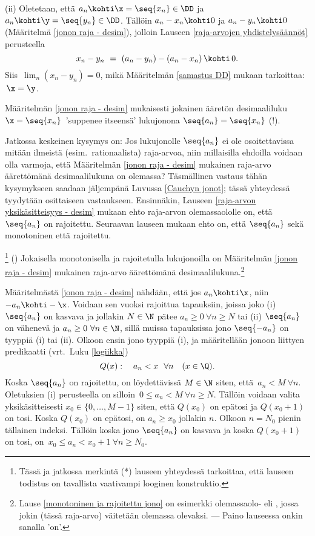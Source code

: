 (ii) Oletetaan, että $a_n \kohti \x = \seq{x_n}\in\DD$ ja $a_n \kohti \y = \seq{y_n}\in\DD$.
Tällöin $a_n-x_n \kohti 0$ ja $a_n-y_n \kohti 0$ (Määritelmä \ref{jonon raja - desim}),
jolloin Lauseen \ref{raja-arvojen yhdistelysäännöt} perusteella
\[
x_n-y_n\ =\ (a_n-y_n)-(a_n-x_n) \,\kohti\, 0.
\]
Siis $\,\lim_n(x_n-y_n)=0$, mikä Määritelmän \ref{samastus DD} mukaan tarkoittaa: $\,\x=\y$.
\loppu
\begin{Exa} Määritelmän \ref{jonon raja - desim} mukaisesti jokainen ääretön desimaaliluku
$\x=\seq{x_n}\,$ 'suppenee itseensä' lukujonona $\seq{a_n}=\seq{x_n}$ (!). \loppu
\end{Exa}

Jatkossa keskeinen kysymys on: Jos lukujonolle $\seq{a_n}$ ei ole osoitettavissa mitään
ilmeistä (esim.\ rationaalista) raja-arvoa, niin millaisilla ehdoilla voidaan olla varmoja,
että Määritelmän \ref{jonon raja - desim} mukainen raja-arvo äärettömänä desimaalilukuna on
olemassa? Täsmällinen vastaus tähän kysymykseen saadaan jäljempänä Luvussa \ref{Cauchyn jonot};
tässä yhteydessä tyydytään osittaiseen vastaukseen. Ensinnäkin, Lauseen
\ref{raja-arvon yksikäsitteisyys - desim} mukaan  ehto raja-arvon
olemassaololle on, että $\seq{a_n}$ on rajoitettu. Seuraavan lauseen mukaan 
ehto on, että $\seq{a_n}$ sekä monotoninen että rajoitettu. 
\begin{*Lause}\footnote[2]{Tässä ja jatkossa merkintä (*) lauseen yhteydessä tarkoittaa,
että lauseen todistus on tavallista vaativampi looginen konstruktio.} 
\label{monotoninen ja rajoitettu jono} ()
Jokaisella monotonisella ja rajoitetulla lukujonoilla on Määritelmän
\ref{jonon raja - desim} mukainen raja-arvo äärettömänä desimaalilukuna.\footnote[3]{Lause
\ref{monotoninen ja rajoitettu jono} on esimerkki olemassaolo- eli ,
jossa jokin (tässä raja-arvo) väitetään olemassa olevaksi. --- Paino lauseessa onkin sanalla
'on'. }
\end{*Lause}
\tod Määritelmästä \ref{jonon raja - desim} nähdään, että jos $a_n \kohti \x$, niin
$-a_n \kohti -\x$. Voidaan sen vuoksi rajoittua tapauksiin, joissa joko (i) $\seq{a_n}$ on
kasvava ja jollakin $N\in\N$ pätee $a_n \ge 0\ \forall n \ge N$ tai (ii) $\seq{a_n}$ on
vähenevä ja $a_n \ge 0\ \forall n\in\N$, sillä muissa tapauksissa jono $\seq{-a_n}$ on tyyppiä
(i) tai (ii). Olkoon ensin jono tyyppiä (i), ja määritellään jonoon liittyen predikaatti
(vrt.\ Luku \ref{logiikka})
\[
Q(x): \quad a_n < x \ \ \forall n \quad (x \in \Q).
\]
Koska $\seq{a_n}$ on rajoitettu, on löydettävissä $M \in \N$ siten, että $\,a_n < M\ \forall n$.
Oletuksien (i) perusteella on silloin $\,0 \le a_n < M\ \forall n \ge N$. Tällöin voidaan valita
yksikäsitteisesti $x_0 \in \{0,\ldots,M-1\}$ siten, että $Q(x_0)$ on epätosi ja $Q(x_0 + 1)$ on 
tosi. Koska $Q(x_0)$ on epätosi, on $a_n \ge x_0$ jollakin $n$. Olkoon $n=N_0$ pienin tällainen 
indeksi. Tällöin koska jono $\seq{a_n}$ on kasvava ja koska $Q(x_0+1)$ on tosi, on 
$\,x_0 \le a_n < x_0 + 1\ \forall n \ge N_0$.

